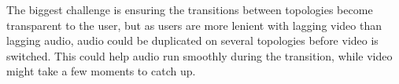 The biggest challenge is ensuring the transitions between topologies become transparent to the user, but as users are more lenient with lagging video than lagging audio, audio could be duplicated on several topologies before video is switched. This could help audio run smoothly during the transition, while video might take a few moments to catch up.
